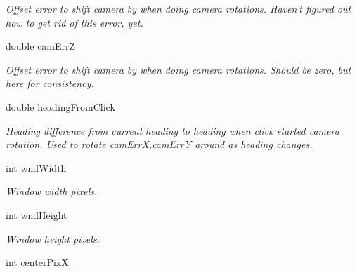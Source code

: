 \begin{DoxyCompactItemize}
\begin{DoxyCompactList}\small\item\em Offset error to shift camera by when doing camera rotations. Haven't figured out how to get rid of this error, yet. \end{DoxyCompactList}\item 
\hypertarget{class_viewer3_d_a60bf401460786fc90f986686379b7063}{
double \hyperlink{class_viewer3_d_a60bf401460786fc90f986686379b7063}{camErrZ}}
\label{class_viewer3_d_a60bf401460786fc90f986686379b7063}

\begin{DoxyCompactList}\small\item\em Offset error to shift camera by when doing camera rotations. Should be zero, but here for consistency. \end{DoxyCompactList}\item 
\hypertarget{class_viewer3_d_a6054f8dbab081c538e60075ba392b575}{
double \hyperlink{class_viewer3_d_a6054f8dbab081c538e60075ba392b575}{headingFromClick}}
\label{class_viewer3_d_a6054f8dbab081c538e60075ba392b575}

\begin{DoxyCompactList}\small\item\em Heading difference from current heading to heading when click started camera rotation. Used to rotate camErrX,camErrY around as heading changes. \end{DoxyCompactList}\item 
\hypertarget{class_viewer3_d_a47edd67ea20c97d51ebf279036ac334c}{
int \hyperlink{class_viewer3_d_a47edd67ea20c97d51ebf279036ac334c}{wndWidth}}
\label{class_viewer3_d_a47edd67ea20c97d51ebf279036ac334c}

\begin{DoxyCompactList}\small\item\em Window width pixels. \end{DoxyCompactList}\item 
\hypertarget{class_viewer3_d_a1fca916677383bd298628a365f9ca31d}{
int \hyperlink{class_viewer3_d_a1fca916677383bd298628a365f9ca31d}{wndHeight}}
\label{class_viewer3_d_a1fca916677383bd298628a365f9ca31d}

\begin{DoxyCompactList}\small\item\em Window height pixels. \end{DoxyCompactList}\item 
\hypertarget{class_viewer3_d_aae51737f0bf7a71292c1deaedc0b8a6c}{
int \hyperlink{class_viewer3_d_aae51737f0bf7a71292c1deaedc0b8a6c}{centerPixX}}
\label{class_viewer3_d_aae51737f0bf7a71292c1deaedc0b8a6c}


\end{DoxyCompactItemize}
